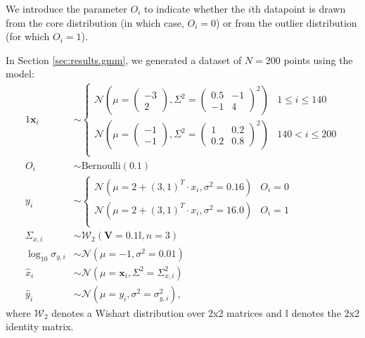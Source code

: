 \documentclass[fleqn,usenatbib]{rasti}
\begin{document}
We introduce the parameter $O_i$ to indicate whether the $i$th datapoint is
drawn from the core distribution (in which case, $O_i = 0$) or from the outlier
distribution (for which $O_i = 1$).

In Section \ref{sec:results.gmm}, we generated a dataset of $N = 200$ points
using the model:
\begin{alignat}{1}
    \boldsymbol{x}_i& \sim
    \begin{cases}
        \mathcal N \left(
            \mu = \begin{pmatrix} -3 \\ 2 \end{pmatrix},
            \Sigma^2 = \begin{pmatrix} 0.5 & -1 \\ -1 & 4 \end{pmatrix}^2
        \right) &
            1 \leqslant i \leqslant 140 \\
        \mathcal N \left(
            \mu = \begin{pmatrix} -1 \\ -1 \end{pmatrix},
            \Sigma^2 = \begin{pmatrix} 1 & 0.2 \\ 0.2 & 0.8 \end{pmatrix}^2
        \right) &
            140 < i \leqslant 200 \\
    \end{cases}\\
    O_i& \sim \mathrm{Bernoulli}(0.1) \\
    y_i& \sim
    \begin{cases}
        \mathcal N (\mu = 2 + (3, 1)^T \cdot x_i, \sigma^2 = 0.16) &
            O_i = 0 \\
        \mathcal N (\mu = 2 + (3, 1)^T \cdot x_i, \sigma^2 = 16.0) &
            O_i = 1 \\
    \end{cases}\\
    \Sigma_{x, i}& \sim \mathcal W_2 (\boldsymbol{V} = 0.1 \mathbb{I}, n = 3) \\
    \log_{10} \sigma_{y, i}& \sim \mathcal N (\mu = -1, \sigma^2 = 0.01) \\
    \hat{x}_i& \sim \mathcal N (\mu = \boldsymbol{x}_i, \Sigma^2 = \Sigma_{x, i}^2) \\
    \hat{y}_i& \sim \mathcal N (\mu = y_i, \sigma^2 = \sigma_{y, i}^2),
\end{alignat}
where $\mathcal W_2$ denotes a Wishart distribution over 2x2 matrices and
$\mathbb{I}$ denotes the 2x2 identity matrix.
\end{document}

